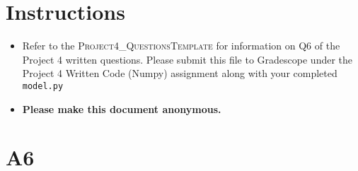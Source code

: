 \section*{Instructions}
\begin{itemize}
	\item Refer to the \textsc{Project4\_QuestionsTemplate} for information on Q6 of the Project 4 written questions. Please submit this file to Gradescope under the Project 4 Written Code (Numpy)	assignment along with your completed \texttt{model.py}
	\item \textbf{Please make this document anonymous.}
\end{itemize}

\section*{A6}

